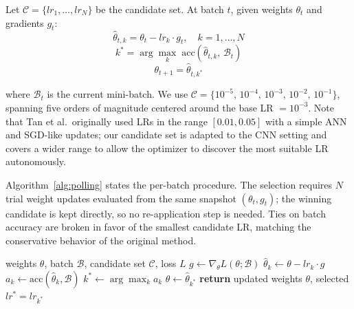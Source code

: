 \documentclass[conference]{IEEEtran}
\begin{document}
Let $\mathcal{C} = \{lr_1, \ldots, lr_N\}$ be the candidate set. At batch $t$, given weights $\theta_t$ and gradients $g_t$:
\begin{equation}
\hat{\theta}_{t,k} = \theta_t - lr_k \cdot g_t, \quad k = 1,\ldots,N
\end{equation}
\begin{equation}
k^{*} = \arg\max_{k} \; \mathrm{acc}(\hat{\theta}_{t,k},\, \mathcal{B}_t)
\end{equation}
\begin{equation}
\theta_{t+1} = \hat{\theta}_{t,k^{*}}
\end{equation}

where $\mathcal{B}_t$ is the current mini-batch. We use $\mathcal{C} = \{10^{-5},\, 10^{-4},\, 10^{-3},\, 10^{-2},\, 10^{-1}\}$, spanning five orders of magnitude centered around the base LR $= 10^{-3}$. Note that Tan et al.\ originally used LRs in the range $[0.01, 0.05]$ with a simple ANN and SGD-like updates; our candidate set is adapted to the CNN setting and covers a wider range to allow the optimizer to discover the most suitable LR autonomously.

Algorithm~\ref{alg:polling} states the per-batch procedure. The selection requires $N$ trial weight updates evaluated from the same snapshot $(\theta_t, g_t)$; the winning candidate is kept directly, so no re-application step is needed. Ties on batch accuracy are broken in favor of the smallest candidate LR, matching the conservative behavior of the original method.

\begin{algorithm}[htbp]
\caption{Polling step (base method, one batch)}
\label{alg:polling}
\begin{algorithmic}[1]
\REQUIRE weights $\theta$, batch $\mathcal{B}$, candidate set $\mathcal{C}$, loss $L$
\STATE $g \leftarrow \nabla_\theta L(\theta; \mathcal{B})$ 
    \STATE $\hat{\theta}_k \leftarrow \theta - lr_k \cdot g$ 
    \STATE $a_k \leftarrow \mathrm{acc}(\hat{\theta}_k, \mathcal{B})$
\ENDFOR
\STATE $k^{*} \leftarrow \arg\max_k a_k$ 
\STATE $\theta \leftarrow \hat{\theta}_{k^{*}}$
\STATE \textbf{return} updated weights $\theta$, selected $lr^{*} = lr_{k^{*}}$
\end{algorithmic}
\end{algorithm}
\end{document}
